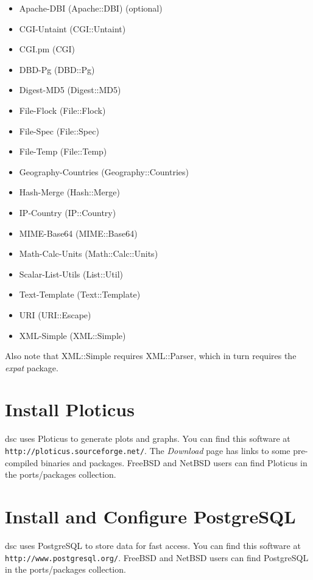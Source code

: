 \documentclass{report}
\def\dsc{{\sc dsc}}
\begin{document}
\begin{itemize}
\setlength{\itemsep}{0ex plus 0.5ex minus 0.0ex}
	\item Apache-DBI (Apache::DBI) (optional)
	\item CGI-Untaint (CGI::Untaint)
	\item CGI.pm (CGI)
	\item DBD-Pg (DBD::Pg)
	\item Digest-MD5 (Digest::MD5)
	\item File-Flock (File::Flock)
	\item File-Spec (File::Spec)
	\item File-Temp (File::Temp)
	\item Geography-Countries (Geography::Countries)
	\item Hash-Merge (Hash::Merge)
	\item IP-Country (IP::Country)
	\item MIME-Base64 (MIME::Base64)
	\item Math-Calc-Units (Math::Calc::Units)
	\item Scalar-List-Utils (List::Util)
	\item Text-Template (Text::Template)
	\item URI (URI::Escape)
	\item XML-Simple (XML::Simple)

\end{itemize}

\noindent
Also note that XML::Simple requires XML::Parser, which in
turn requires the {\em expat\/} package.

\section{Install Ploticus}

{\dsc} uses Ploticus to generate plots and graphs.  You can find
this software at \verb|http://ploticus.sourceforge.net/|.  The {\em
Download\/} page has links to some pre-compiled binaries and packages.
FreeBSD and NetBSD users can find Ploticus in the ports/packages
collection.

\section{Install and Configure PostgreSQL}

{\dsc} uses PostgreSQL to store data for fast access.  You can find
this software at \verb|http://www.postgresql.org/|.
FreeBSD and NetBSD users can find PostgreSQL in the ports/packages
collection.
\end{document}
